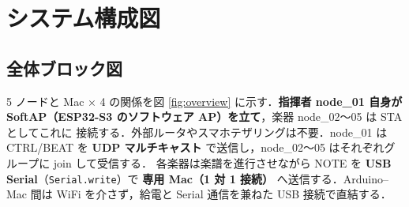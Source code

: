 \documentclass[lualatex,book,paper=a4paper,jafontsize=11.5pt,jafontscale=1.05]{jlreq}
\begin{document}
\section{システム構成図}\label{sec:basic-architecture}

\subsection{全体ブロック図}

5 ノードと Mac × 4 の関係を図 \ref{fig:overview} に示す．\textbf{指揮者 node\_01 自身が
SoftAP（ESP32-S3 のソフトウェア AP）を立て}，楽器 node\_02〜05 は STA としてこれに
接続する．外部ルータやスマホテザリングは不要．node\_01 は CTRL/BEAT を
\textbf{UDP マルチキャスト} で送信し，node\_02〜05 はそれぞれグループに join して受信する．
各楽器は楽譜を進行させながら NOTE を \textbf{USB Serial}（\texttt{Serial.write}）で
\textbf{専用 Mac（1 対 1 接続）} へ送信する．Arduino--Mac 間は WiFi を介さず，給電と
Serial 通信を兼ねた USB 接続で直結する．
\end{document}
